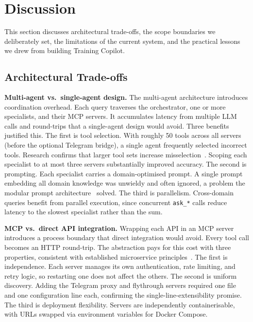 \section{Discussion}\label{sec:discussion}

This section discusses architectural trade-offs, the scope boundaries we deliberately set, the limitations of the current system, and the practical lessons we drew from building Training Copilot.

\subsection{Architectural Trade-offs}\label{sec:discussion:tradeoffs}

\textbf{Multi-agent vs.\ single-agent design.} The multi-agent architecture introduces coordination overhead. Each query traverses the orchestrator, one or more specialists, and their MCP servers. It accumulates latency from multiple LLM calls and round-trips that a single-agent design would avoid. Three benefits justified this. The first is tool selection. With roughly 50 tools across all servers (before the optional Telegram bridge), a single agent frequently selected incorrect tools. Research confirms that larger tool sets increase misselection~\citep{qu_tool_2024, patil_gorilla_2023}. Scoping each specialist to at most three servers substantially improved accuracy. The second is prompting. Each specialist carries a domain-optimised prompt. A single prompt embedding all domain knowledge was unwieldy and often ignored, a problem the modular prompt architecture~\citep{wang_survey_2024} solved. The third is parallelism. Cross-domain queries benefit from parallel execution, since concurrent \texttt{ask\_*} calls reduce latency to the slowest specialist rather than the sum.

\textbf{MCP vs.\ direct API integration.} Wrapping each API in an MCP server introduces a process boundary that direct integration would avoid. Every tool call becomes an HTTP round-trip. The abstraction pays for this cost with three properties, consistent with established microservice principles~\citep{dragoni_microservices_2017}. The first is independence. Each server manages its own authentication, rate limiting, and retry logic, so restarting one does not affect the others. The second is uniform discovery. Adding the Telegram proxy and flythrough servers required one file and one configuration line each, confirming the single-line-extensibility promise. The third is deployment flexibility. Servers are independently containerisable, with URLs swapped via environment variables for Docker Compose.

